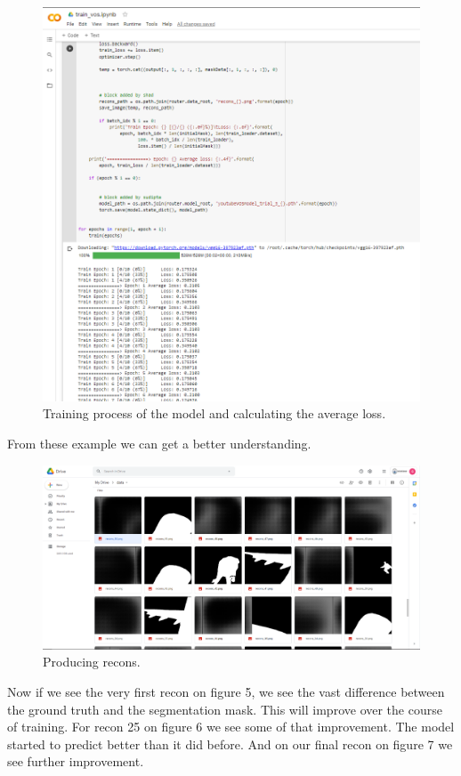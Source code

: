 \documentclass[conference]{IEEEtran}
\begin{document}
\begin{figure}[h!]
\centering
\includegraphics[scale=.3]{train_code.png}
\caption{Training process of the model and calculating the average loss.}
\label{fig:train_code}
\end{figure}
\newline
From these example we can get a better understanding.
\begin{figure}[h!]
\centering
\includegraphics[scale=.18]{recons.png}
\caption{Producing recons.}
\label{fig:recons}
\end{figure}
\newline
Now if we see the very first recon on figure 5, we see the vast difference between the ground truth and the segmentation mask. This will improve over the course of training. For recon 25 on figure 6 we see some of that improvement. The model started to predict better than it did before. And on our final recon on figure 7 we see further improvement. 
\end{document}
